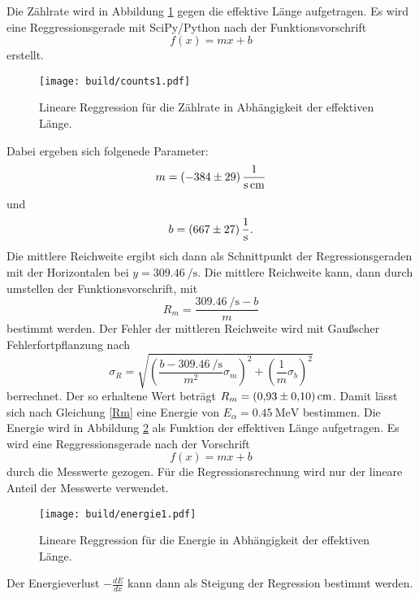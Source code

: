 \noindent Die Zählrate wird in Abbildung \ref{fig:c1} gegen die effektive Länge aufgetragen.
Es wird eine Reggressionsgerade mit SciPy/Python nach der Funktionsvorschrift
\begin{equation*}
  f(x) = mx +b
\end{equation*}
erstellt.
\begin{figure}[H]
  \centering
  \texttt{[image: build/counts1.pdf]}
  \caption{Lineare Reggression für die Zählrate in Abhängigkeit der effektiven Länge.}
  \label{fig:c1}
\end{figure}
\noindent Dabei ergeben sich folgenede Parameter:
\begin{equation*}
  m =\SI{-384\pm29}{\per\second\per\centi\meter}
\end{equation*}
und
\begin{equation*}
  b =\SI{667\pm27}{\per\second}.
\end{equation*}
Die mittlere Reichweite ergibt sich dann als Schnittpunkt der Regressionsgeraden mit der Horizontalen bei $y=\SI{309.46}{\per\second}$.
Die mittlere Reichweite kann, dann durch umstellen der Funktionsvorschrift, mit
\begin{equation*}
  R_m=\frac{\SI[per-mode=reciprocal]{309.46}{\per\second}-b}{m}
\end{equation*}
bestimmt werden.
Der Fehler der mittleren Reichweite wird mit Gaußscher Fehlerfortpflanzung nach
\begin{equation*}
  \sigma_R = \sqrt{\left(\frac{b-\SI{309.46}{\per\second}}{m^2}\sigma_m\right)^2 +\left(\frac{1}{m}\sigma_b\right)^2}
\end{equation*}
berrechnet.
Der so erhaltene Wert beträgt $R_m= \SI{0.93\pm0.1}{\centi\meter}$.
Damit lässt sich nach Gleichung \eqref{Rm} eine Energie von $E_{\alpha} = \SI{0.45}{\mega\electronvolt}$ bestimmen.
Die Energie wird in Abbildung \ref{fig:e1} als Funktion der effektiven Länge aufgetragen.
Es wird eine Reggressionsgerade nach der Vorschrift
\begin{equation*}
  f(x) = mx + b
\end{equation*}
durch die Messwerte gezogen.
Für die Regressionsrechnung wird nur der lineare Anteil der Messwerte verwendet.
\begin{figure}[H]
  \centering
  \texttt{[image: build/energie1.pdf]}
  \caption{Lineare Reggression für die Energie in Abhängigkeit der effektiven Länge.}
  \label{fig:e1}
\end{figure}
\noindent Der Energieverlust $-\frac{dE}{dx}$ kann dann als Steigung der Regression bestimmt werden.
